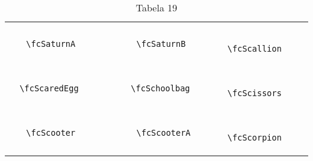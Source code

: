 \documentclass[x11names]{article}
\begin{document}
\begin{table}[H]
\begin{tabular}{|c|c|c|c|c|c|}
		&\multirow{5}{*}{	\fcSaturnA	[scale=0.4]} & &\multirow{5}{*}{	\fcSaturnB	[scale=0.4]} & &\multirow{5}{*}{	\fcScallion	[scale=0.4]}\\	& & & & & \\	& & & & & \\	\verb|	\fcSaturnA	| & & \verb|	\fcSaturnB	| & & \verb|	\fcScallion	| & \\	& & & & & \\	& & & & & \\	& & & & & \\	\hline									
		&\multirow{5}{*}{	\fcScaredEgg	[scale=0.4]} & &\multirow{5}{*}{	\fcSchoolbag	[scale=0.4]} & &\multirow{5}{*}{	\fcScissors	[scale=0.4]}\\	& & & & & \\	& & & & & \\	\verb|	\fcScaredEgg	| & & \verb|	\fcSchoolbag	| & & \verb|	\fcScissors	| & \\	& & & & & \\	& & & & & \\	& & & & & \\	\hline									
		&\multirow{5}{*}{	\fcScooter	[scale=0.4]} & &\multirow{5}{*}{	\fcScooterA	[scale=0.4]} & &\multirow{5}{*}{	\fcScorpion	[scale=0.4]}\\	& & & & & \\	& & & & & \\	\verb|	\fcScooter	| & & \verb|	\fcScooterA	| & & \verb|	\fcScorpion	| & \\	& & & & & \\	& & & & & \\	& & & & & \\		\hline 	\hline 	\end{tabular}	\caption{	Tabela 19	}\label{	Tab19	}\end{table}
\end{document}
